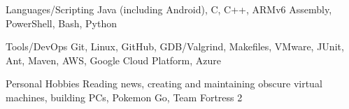 

\begin{cvskills}


  \cvskill
    {Languages/Scripting} %
    {Java (including Android), C, C++, ARMv6 Assembly, PowerShell, Bash, Python} %
    
  \cvskill
    {Tools/DevOps} %
    {Git, Linux, GitHub, GDB/Valgrind, Makefiles, VMware, JUnit, Ant, Maven, AWS, Google Cloud Platform, Azure} %

  \cvskill
  {Personal Hobbies} %
  {Reading news, creating and maintaining obscure virtual machines, building PCs, Pokemon Go, Team Fortress 2} %

\end{cvskills}
